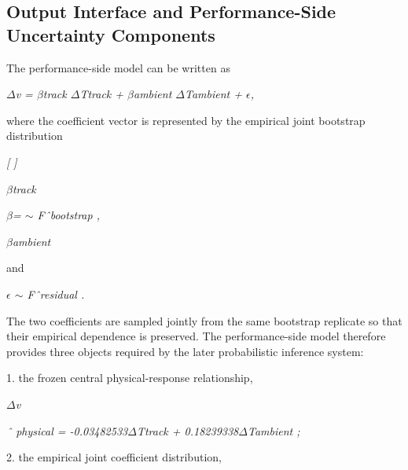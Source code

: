 \subsection{Output Interface and Performance-Side Uncertainty Components}
The performance-side model can be written as

\begin{center}\textit{\ensuremath{\Delta}v = \ensuremath{\beta}track \ensuremath{\Delta}Ttrack + \ensuremath{\beta}ambient \ensuremath{\Delta}Tambient + \ensuremath{\epsilon},}\end{center}

where the coefficient vector is represented by the empirical joint bootstrap distribution

\begin{center}\textit{[     ]}\end{center}

\begin{center}\textit{\ensuremath{\beta}track}\end{center}

\begin{center}\textit{\ensuremath{\beta}=             \ensuremath{\sim} Fˆbootstrap ,}\end{center}

\begin{center}\textit{\ensuremath{\beta}ambient}\end{center}

and

\begin{center}\textit{\ensuremath{\epsilon} \ensuremath{\sim} Fˆresidual .}\end{center}

The two coefficients are sampled jointly from the same bootstrap replicate so that their empirical dependence is preserved. The performance-side model therefore provides three objects required by the later probabilistic inference system:

1. the frozen central physical-response relationship,

\begin{center}\textit{\ensuremath{\Delta}v}\end{center}

\begin{center}\textit{ˆ physical = -0.03482533\ensuremath{\Delta}Ttrack + 0.18239338\ensuremath{\Delta}Tambient ;}\end{center}

2. the empirical joint coefficient distribution,

